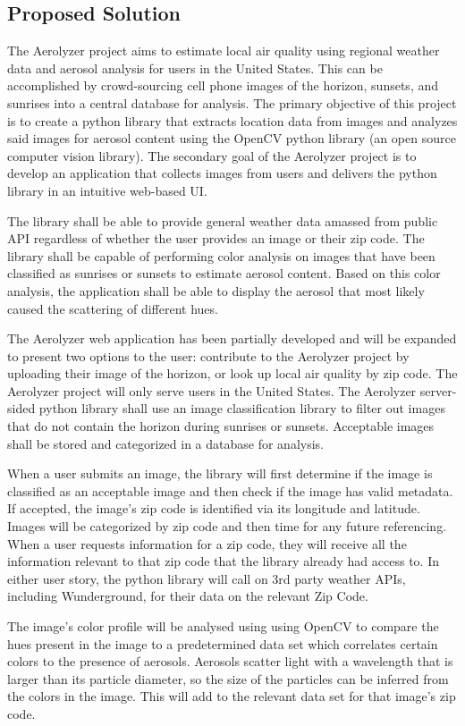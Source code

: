 \documentclass[letterpaper,10pt,draftclsnofoot,onecolumn]{IEEEtran}
\newcommand\tab[1][1cm]{\hspace*{#1}}
\begin{document}
\begin{flushleft}
\section{Proposed Solution}
\tab The Aerolyzer project aims to estimate local air quality using regional weather data and aerosol analysis for users in the United States. This can be accomplished by crowd-sourcing cell phone images of the horizon, sunsets, and sunrises into a central database for analysis. The primary objective of this project is to create a python library that extracts location data from images and analyzes said images for aerosol content using the OpenCV python library (an open source computer vision library). The secondary goal of the Aerolyzer project is to develop an application that collects images from users and delivers the python library in an intuitive web-based UI. 
\par
\tab The library shall be able to provide general weather data amassed from public API regardless of whether the user provides an image or their zip code. The library  shall be capable of performing color analysis on images that have been classified as sunrises or sunsets to estimate aerosol content. Based on this color analysis, the application shall be able to display the aerosol that most likely caused the scattering of different hues.
\par
\tab The Aerolyzer web application has been partially developed and will be expanded to present two options to the user: contribute to the Aerolyzer project by uploading their image of the horizon, or look up local air quality by zip code. The Aerolyzer project will only serve users in the United States. The Aerolyzer server-sided python library shall use an image classification library to filter out images that do not contain the horizon during sunrises or sunsets. Acceptable images shall be stored and categorized in a database for analysis. 
\par
\tab When a user submits an image, the library will first determine if the image is classified as an acceptable image and then check if the image has valid metadata. If accepted, the image's zip code is identified via its longitude and latitude. Images will be categorized by zip code and then time for any future referencing. When a user requests information for a zip code, they will receive all the information relevant to that zip code that the library already had access to. In either user story, the python library will call on 3rd party weather APIs, including Wunderground, for their data on the relevant Zip Code.
\par
\tab The image's color profile will be analysed using using OpenCV to compare the hues present in the image to a predetermined data set which correlates certain colors to the presence of aerosols. Aerosols scatter light with a wavelength that is larger than its particle diameter, so the size of the particles can be inferred from the colors in the image. This will add to the relevant data set for that image's zip code. 


\end{flushleft}
\end{document}
